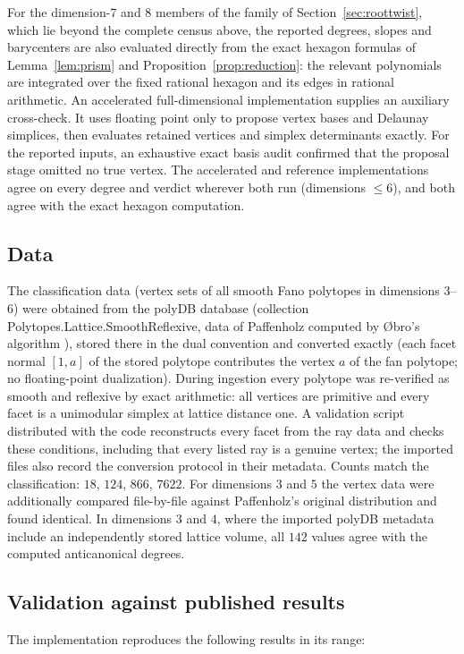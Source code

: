 \documentclass[11pt]{amsart}
\theoremstyle{definition}
\theoremstyle{remark}
\begin{document}
For the dimension-$7$ and $8$ members of the family of
Section~\ref{sec:roottwist}, which lie beyond the complete census above, the
reported degrees, slopes and barycenters are also evaluated directly from the
exact hexagon formulas of Lemma~\ref{lem:prism} and
Proposition~\ref{prop:reduction}: the relevant polynomials are integrated over
the fixed rational hexagon and its edges in rational arithmetic. An
accelerated full-dimensional implementation supplies an auxiliary cross-check.
It uses floating point only to propose vertex bases and Delaunay simplices,
then evaluates retained vertices and simplex determinants exactly. For the
reported inputs, an exhaustive exact basis audit confirmed that the proposal
stage omitted no true vertex. The accelerated and reference implementations
agree on every degree and verdict wherever both run (dimensions $\le 6$), and
both agree with the exact hexagon computation.

\subsection{Data}
The classification data (vertex sets of all smooth Fano polytopes in
dimensions $3$--$6$) were obtained from the \textsf{polyDB} database
(collection \textsf{Polytopes.Lattice.SmoothReflexive}, data of
Paffenholz computed by \O bro's algorithm \cite{Obro2007,polyDB}), stored
there in the dual convention and converted exactly (each facet normal
$[1, a]$ of the stored polytope contributes the vertex $a$ of the fan
polytope; no floating-point dualization). During ingestion every polytope was
re-verified as smooth and reflexive by exact arithmetic: all vertices are
primitive and every facet is a unimodular simplex at lattice distance one.
A validation script distributed with the code reconstructs every facet from the ray data and checks
these conditions, including that every listed ray is a genuine vertex; the
imported files also record the conversion protocol in their metadata. Counts match the
classification: $18$, $124$, $866$, $7622$. For dimensions $3$ and $5$
the vertex data were additionally compared file-by-file against
Paffenholz's original distribution and found identical. In dimensions $3$
and $4$, where the imported polyDB metadata include an independently stored
lattice volume, all $142$ values agree with the computed anticanonical
degrees.

\subsection{Validation against published results}\label{sec:validation}
The implementation reproduces the following results in its range:
\end{document}
